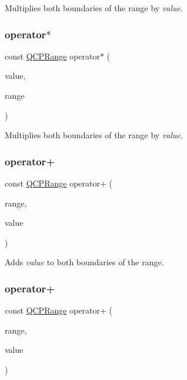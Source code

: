 Multiplies both boundaries of the range by {\itshape value}. \mbox{\label{class_q_c_p_range_a5cb2332f6957021f47cc768089f4f090}} 
\subsubsection{\texorpdfstring{operator$\ast$}{operator*}\hspace{0.1cm}{\footnotesize\ttfamily [4/4]}}
{\footnotesize\ttfamily const \hyperlink{class_q_c_p_range}{Q\+C\+P\+Range} operator$\ast$ (\begin{DoxyParamCaption}\item[{double}]{value,  }\item[{const \hyperlink{class_q_c_p_range}{Q\+C\+P\+Range} \&}]{range }\end{DoxyParamCaption})\hspace{0.3cm}{\ttfamily [friend]}}

Multiplies both boundaries of the range by {\itshape value}. \mbox{\label{class_q_c_p_range_af53ea6fb823a4a5897162b865841de04}} 
\subsubsection{\texorpdfstring{operator+}{operator+}\hspace{0.1cm}{\footnotesize\ttfamily [1/4]}}
{\footnotesize\ttfamily const \hyperlink{class_q_c_p_range}{Q\+C\+P\+Range} operator+ (\begin{DoxyParamCaption}\item[{const \hyperlink{class_q_c_p_range}{Q\+C\+P\+Range} \&}]{range,  }\item[{double}]{value }\end{DoxyParamCaption})\hspace{0.3cm}{\ttfamily [friend]}}

Adds {\itshape value} to both boundaries of the range. \mbox{\label{class_q_c_p_range_af53ea6fb823a4a5897162b865841de04}} 
\subsubsection{\texorpdfstring{operator+}{operator+}\hspace{0.1cm}{\footnotesize\ttfamily [2/4]}}
{\footnotesize\ttfamily const \hyperlink{class_q_c_p_range}{Q\+C\+P\+Range} operator+ (\begin{DoxyParamCaption}\item[{const \hyperlink{class_q_c_p_range}{Q\+C\+P\+Range} \&}]{range,  }\item[{double}]{value }\end{DoxyParamCaption})\hspace{0.3cm}{\ttfamily [friend]}}

